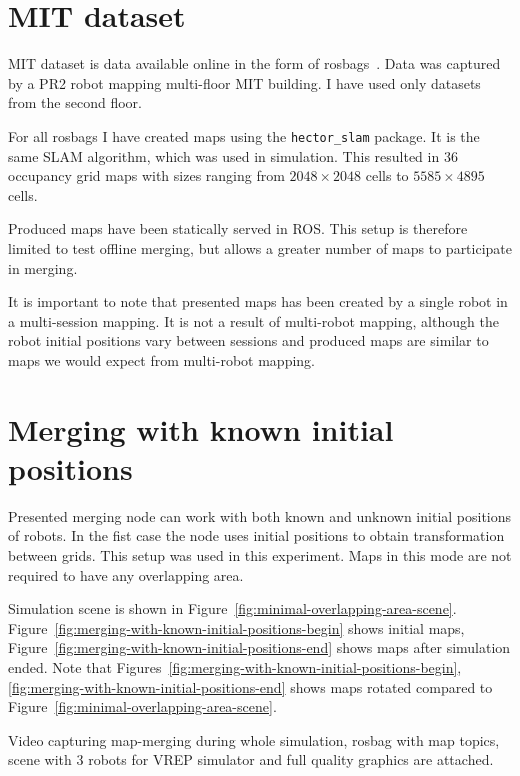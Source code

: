\section{\gls{MIT} dataset}
\label{sec:mit-dataset}

\gls{MIT} dataset is data available online in the form of rosbags~\cite{Fallon2013}. Data was captured by a PR2 robot mapping multi-floor \gls{MIT} building. I have used only datasets from the second floor.

For all rosbags I have created maps using the \texttt{hector\_slam} package. It is the same \gls{SLAM} algorithm, which was used in simulation. This resulted in $36$ occupancy grid maps with sizes ranging from $2048 \times 2048$ cells to $5585 \times 4895$ cells.

Produced maps have been statically served in \gls{ROS}. This setup is therefore limited to test offline merging, but allows a greater number of maps to participate in merging.

It is important to note that presented maps has been created by a single robot in a multi-session mapping. It is not a result of multi-robot mapping, although the robot initial positions vary between sessions and produced maps are similar to maps we would expect from multi-robot mapping.

\section{Merging with known initial positions}
\label{sec:merging-with-known-initial-positions}

Presented merging node can work with both known and unknown initial positions of robots. In the fist case the node uses initial positions to obtain transformation between grids. This setup was used in this experiment. Maps in this mode are not required to have any overlapping area.

Simulation scene is shown in Figure~\ref{fig:minimal-overlapping-area-scene}. Figure~\ref{fig:merging-with-known-initial-positions-begin} shows initial maps, Figure~\ref{fig:merging-with-known-initial-positions-end} shows maps after simulation ended. Note that Figures~\ref{fig:merging-with-known-initial-positions-begin}, \ref{fig:merging-with-known-initial-positions-end} shows maps rotated compared to Figure~\ref{fig:minimal-overlapping-area-scene}.

Video capturing map-merging during whole simulation, rosbag with map topics, scene with $3$ robots for \gls{VREP} simulator and full quality graphics are attached.

